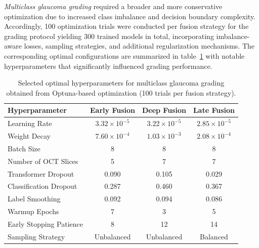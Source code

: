 \documentclass[preprint,12pt]{elsarticle}
\begin{document}
\emph{Multiclass glaucoma grading} required a broader and more conservative optimization due to increased class imbalance and decision boundary complexity. Accordingly, 100 optimization trials were conducted per fusion strategy for the grading protocol yielding 300 trained models in total, incorporating imbalance-aware losses, sampling strategies, and additional regularization mechanisms. The corresponding optimal configurations are summarized in table~\ref{tab:optimum-hyperparameters-multiclass} with notable hyperparameters that significantly influenced grading performance.

\begin{table}[htb]
    \centering
    \caption{Selected optimal hyperparameters for multiclass glaucoma grading obtained from Optuna-based optimization (100 trials per fusion strategy).}
    \label{tab:optimum-hyperparameters-multiclass}
    \scriptsize
    \setlength{\tabcolsep}{6pt}
    \begin{tabular}{|l|c|c|c|}
        \hline
        \textbf{Hyperparameter} & \textbf{Early Fusion} & \textbf{Deep Fusion} & \textbf{Late Fusion} \\
        \hline
        Learning Rate           & $3.32\times10^{-5}$   & $3.22\times10^{-5}$  & $2.85\times10^{-5}$  \\
        Weight Decay            & $7.60\times10^{-4}$   & $1.03\times10^{-3}$  & $2.08\times10^{-4}$  \\
        Batch Size              & 8                     & 8                    & 8                    \\
        Number of OCT Slices    & 5                     & 7                    & 7                    \\
        Transformer Dropout     & 0.090                 & 0.105                & 0.029                \\
        Classification Dropout  & 0.287                 & 0.460                & 0.367                \\
        Label Smoothing         & 0.092                 & 0.094                & 0.086                \\
        Warmup Epochs           & 7                     & 3                    & 5                    \\
        Early Stopping Patience & 8                     & 12                   & 14                   \\
        Sampling Strategy       & Unbalanced            & Unbalanced           & Balanced             \\

\end{tabular}
\end{table}
\end{document}
